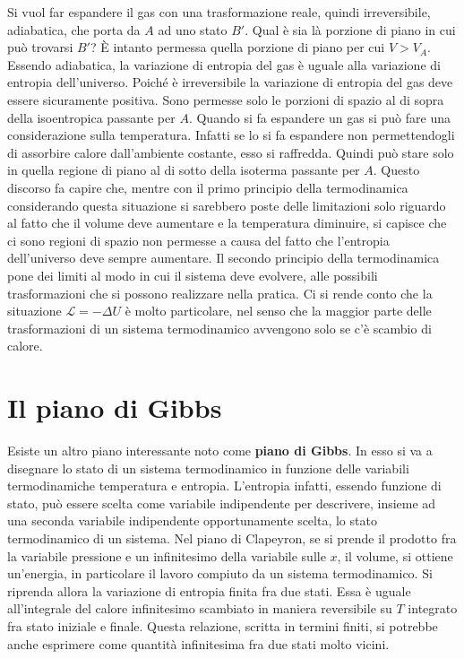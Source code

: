 Si vuol far espandere il gas con una trasformazione reale, quindi irreversibile, adiabatica, che porta da $A$ ad uno stato $B'$. Qual è sia là porzione di piano in cui può trovarsi $B'$?
È intanto permessa quella porzione di piano per cui $V>V_A$. Essendo adiabatica, la variazione di entropia del gas è uguale alla variazione di entropia dell'universo. Poiché è irreversibile la variazione di entropia del gas deve essere sicuramente positiva. Sono permesse solo le porzioni di spazio al di sopra della isoentropica passante per $A$.
Quando si fa espandere un gas si può fare una considerazione sulla temperatura. Infatti se lo si fa espandere non permettendogli di assorbire calore dall'ambiente costante, esso si raffredda. Quindi può stare solo in quella regione di piano al di sotto della isoterma passante per $A$.
Questo discorso fa capire che, mentre con il primo principio della termodinamica considerando questa situazione si sarebbero poste delle limitazioni solo riguardo al fatto che il volume deve aumentare e la temperatura diminuire, si capisce che ci sono regioni di spazio non permesse a causa del fatto che l'entropia dell'universo deve sempre aumentare. Il secondo principio della termodinamica pone dei limiti al modo in cui il sistema deve evolvere, alle possibili trasformazioni che si possono realizzare nella pratica. Ci si rende conto che la situazione $\mathcal{L} = -\Delta U$ è molto particolare, nel senso che la maggior parte delle trasformazioni di un sistema termodinamico avvengono solo se c'è scambio di calore.

\section{Il piano di Gibbs}

Esiste un altro piano interessante noto come \textbf{piano di Gibbs}. In esso si va a disegnare lo stato di un sistema termodinamico in funzione delle variabili termodinamiche temperatura e entropia. L'entropia infatti, essendo funzione di stato, può essere scelta come variabile indipendente per descrivere, insieme ad una seconda variabile indipendente opportunamente scelta, lo stato termodinamico di un sistema. Nel piano di Clapeyron, se si prende il prodotto fra la variabile pressione e un infinitesimo della variabile sulle $x$, il volume, si ottiene un'energia, in particolare il lavoro compiuto da un sistema termodinamico.
Si riprenda allora la variazione di entropia finita fra due stati. Essa è uguale all'integrale del calore infinitesimo scambiato in maniera reversibile su $T$ integrato fra stato iniziale e finale. Questa relazione, scritta in termini finiti, si potrebbe anche esprimere come quantità infinitesima fra due stati molto vicini.

